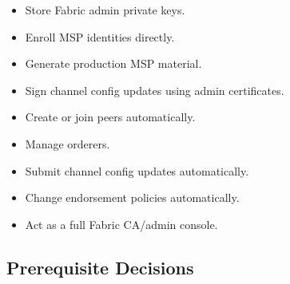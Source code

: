 \begin{itemize}
  \item Store Fabric admin private keys.
  \item Enroll MSP identities directly.
  \item Generate production MSP material.
  \item Sign channel config updates using admin certificates.
  \item Create or join peers automatically.
  \item Manage orderers.
  \item Submit channel config updates automatically.
  \item Change endorsement policies automatically.
  \item Act as a full Fabric CA/admin console.
\end{itemize}

\subsection{Prerequisite Decisions}

